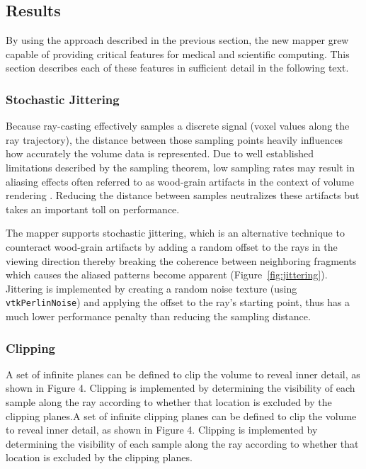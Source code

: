 \subsection{Results}
By using the approach described in the previous section, the new mapper grew capable of providing critical features for medical and scientific computing. This section describes each of these features in sufficient detail in the following text.

\newcommand{\ignore}[1]{}

\subsubsection{Stochastic Jittering}
Because ray-casting effectively samples a discrete signal (voxel values along the ray trajectory), the distance between those sampling points heavily influences how accurately the volume data is represented.  Due to well established limitations described by the sampling theorem, low sampling rates may result in aliasing effects 
often referred to as wood-grain artifacts in the context of volume rendering \ignore{\cite{RTVG_jittering}}. Reducing the distance between samples neutralizes these artifacts but takes an important toll on performance.


The mapper supports stochastic jittering, which is an alternative technique to counteract wood-grain artifacts by adding a random offset to the rays in the viewing direction thereby breaking the coherence between neighboring fragments which causes the aliased patterns become apparent (Figure~\ref{fig:jittering}).  Jittering is implemented by creating a random noise texture (using \texttt{vtkPerlinNoise}) and applying the offset to the ray's starting point, thus has a much lower performance penalty than reducing the sampling distance.


\subsubsection{Clipping}
A set of infinite planes can be defined to clip the volume to reveal inner detail, as shown in Figure 4.  Clipping is implemented by determining the visibility of each sample along the ray according to whether that location is excluded by the clipping planes.A set of infinite clipping planes can be defined to clip the volume to reveal inner detail, as shown in Figure 4.  Clipping is implemented by determining the visibility of each sample along the ray according to whether that location is excluded by the clipping planes.

